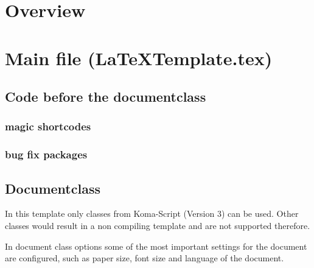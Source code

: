 
\chapter{Overview}

%

\chapter{Main file (LaTeXTemplate.tex)}
\label{sec:doc:MainFile}

\section{Code before the documentclass}

\subsection{magic shortcodes}

\subsection{bug fix packages}

\section{Documentclass}
In this template only classes from Koma-Script (Version 3) can be used.
Other classes would result in a non compiling template and are not supported therefore. 

In document class options some of the most important settings for the document are configured, such as paper size, font size and language of the document.

